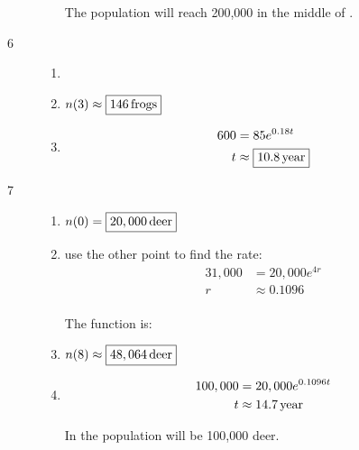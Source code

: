 \documentclass{exam}
\begin{document}
\begin{description}
\begin{enumerate}[a]
            The population will reach 200,000 in the middle of . 

        \end{enumerate}

      \pagebreak

      \item[6] 
        \begin{enumerate}[a]
          \item {}

          \item $n(3) \approx \boxed{\unit[146]{frogs}}$

          \item 
            \begin{align*}
              600 & = 85 e^{0.18t} \\
              t   & \approx \boxed{\unit[10.8]{year}} \\
            \end{align*}

        \end{enumerate}

      \item[7] 
        \begin{enumerate}[a]
          \item $n(0) = \boxed{\unit[20,000]{deer}}$

          \item use the other point to find the rate:
            \begin{align*}
              31,000 & = 20,000 e^{4r} \\
              r      & \approx 0.1096 \\
            \end{align*}

            The function is: 

          \item $n(8) \approx \boxed{\unit[48,064]{deer}}$

          \item 
            \begin{align*}
              100,000 & = 20,000 e^{0.1096 t} \\
              t       & \approx \unit[14.7]{year} \\
            \end{align*}

            In  the population will be 100,000 deer.


\end{enumerate}
\end{description}
\end{document}
